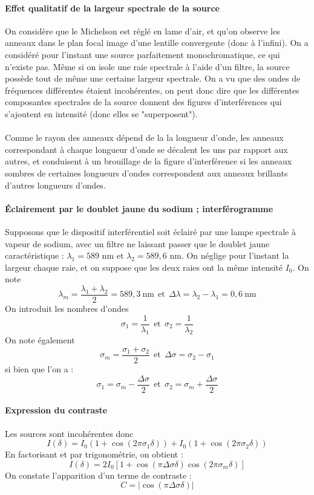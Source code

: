 \documentclass[french]{book}
\theoremstyle{plain}
\theoremstyle{definition}
\theoremstyle{remark}
\begin{document}
\paragraph{Effet qualitatif de la largeur spectrale de la source} On considère que le Michelson est réglé en lame d'air, et qu'on observe les anneaux dans le plan focal image d'une lentille convergente (donc à l'infini). On a considéré pour l'instant une source parfaitement monochromatique, ce qui n'existe pas. Même si on isole une raie spectrale à l'aide d'un filtre, la source possède tout de même une certaine largeur spectrale. On a vu que des ondes de fréquences différentes étaient incohérentes, on peut donc dire que les différentes composantes spectrales de la source donnent des figures d'interférences qui s'ajoutent en intensité (donc elles se "superposent"). \\ \\ Comme le rayon des anneaux dépend de la la longueur d'onde, les anneaux correspondant à chaque longueur d'onde se décalent les uns par rapport aux autres, et conduisent à un brouillage de la figure d'interférence si les anneaux sombres de certaines longueurs d'ondes correspondent aux anneaux brillants d'autres longueurs d'ondes.
\paragraph{Éclairement par le doublet jaune du sodium ; interférogramme}
Supposons que le dispositif interférentiel soit éclairé par une lampe spectrale à vapeur de sodium, avec un filtre ne laissant passer que le doublet jaune caractéristique : $\lambda_1=589$ nm et $\lambda_2=589,6$ nm. On néglige pour l'instant la largeur chaque raie, et on suppose que les deux raies ont la même intensité $I_0$. On note $$\lambda_m=\frac{\lambda_1+\lambda_2}{2}=589,3\ \text{nm} \ \  \text{et} \ \ \Delta\lambda=\lambda_2-\lambda_1=0,6\ \text{nm}$$ On introduit les nombres d'ondes $$\sigma_1=\frac{1}{\lambda_1} \ \ \text{et} \ \  \sigma_2=\frac{1}{\lambda_2}$$ On note également $$\sigma_m=\frac{\sigma_1+\sigma_2}{2} \ \ \text{et} \ \ \Delta\sigma=\sigma_2-\sigma_1$$ si bien que l'on a : $$\sigma_1=\sigma_m-\frac{\Delta\sigma}{2} \ \ \text{et} \ \ \sigma_2=\sigma_m+\frac{\Delta\sigma}{2}$$
\paragraph{Expression du contraste} Les sources sont incohérentes donc $$I(\delta)=I_0(1+\cos(2\pi\sigma_1\delta))+I_0(1+\cos(2\pi\sigma_2\delta))$$ En factorisant et par trigonométrie, on obtient : $$I(\delta)=2I_0\left[1+\cos(\pi\Delta\sigma\delta)\cos(2\pi\sigma_m\delta)\right]$$ On constate l'apparition d'un terme de contraste : $$C=\left\lvert\cos(\pi\Delta\sigma\delta)\right\rvert$$
\end{document}
